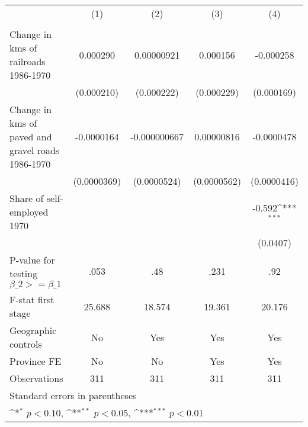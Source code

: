 {
\def\sym#1{\ifmmode^{#1}\else\(^{#1}\)\fi}
\begin{tabular}{l*{4}{c}}
\hline\hline
                &\multicolumn{1}{c}{(1)}&\multicolumn{1}{c}{(2)}&\multicolumn{1}{c}{(3)}&\multicolumn{1}{c}{(4)}\\
                &\multicolumn{1}{c}{}&\multicolumn{1}{c}{}&\multicolumn{1}{c}{}&\multicolumn{1}{c}{}\\
\hline
Change in kms of railroads 1986-1970& 0.000290         &0.00000921         & 0.000156         &-0.000258         \\
                &(0.000210)         &(0.000222)         &(0.000229)         &(0.000169)         \\
[1em]
Change in kms of paved and gravel roads 1986-1970&-0.0000164         &-0.000000667         &0.00000816         &-0.0000478         \\
                &(0.0000369)         &(0.0000524)         &(0.0000562)         &(0.0000416)         \\
[1em]
Share of self-employed 1970&                  &                  &                  &   -0.592\sym{***}\\
                &                  &                  &                  & (0.0407)         \\
\hline
P-value for testing $\beta\_{2} >= \beta\_{1}$&     .053         &      .48         &     .231         &      .92         \\
F-stat first stage&   25.688         &   18.574         &   19.361         &   20.176         \\
Geographic controls&       No         &      Yes         &      Yes         &      Yes         \\
Province FE     &       No         &       No         &      Yes         &      Yes         \\
Observations    &      311         &      311         &      311         &      311         \\
\hline\hline
\multicolumn{5}{l}{\footnotesize Standard errors in parentheses}\\
\multicolumn{5}{l}{\footnotesize \sym{*} \(p<0.10\), \sym{**} \(p<0.05\), \sym{***} \(p<0.01\)}\\
\end{tabular}
}
